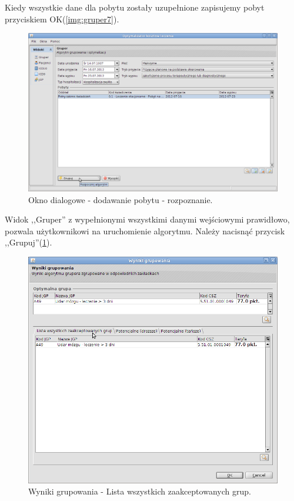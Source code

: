 Kiedy wszystkie dane dla pobytu zostały uzupełnione zapisujemy pobyt przyciskiem OK(\ref{img:gruper7}).

\begin{figure}%
\centering
\includegraphics[scale=0.4]{images/gruper8}
\caption[Widok grupera]{Okno dialogowe - dodawanie pobytu - rozpoznanie.}
\label{img:gruper8}
\end{figure}

Widok ,,Gruper'' z wypełnionymi wszystkimi danymi wejściowymi prawidłowo, pozwala użytkownikowi na uruchomienie algorytmu. Należy nacisnąć przycisk ,,Grupuj''(\ref{img:gruper8}).

\begin{figure}%
\centering
\includegraphics[scale=0.4]{images/gruper9}
\caption[Widok grupera]{Wyniki grupowania - Lista wszystkich zaakceptowanych grup.}
\label{img:gruper9}
\end{figure}

